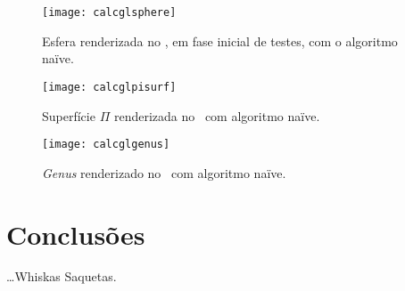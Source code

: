 \begin{figure}[!htbp]
	\centering
	\texttt{[image: calcglsphere]}
	\caption[Esfera no \theapp~com algoritmo naïve]{Esfera renderizada no \theapp, em fase inicial de testes, com o algoritmo naïve.}
	\label{fig::calcglsphere}
\end{figure}

\begin{figure}[!htbp]
	\centering
	\texttt{[image: calcglpisurf]}
	\caption[Superfície $\Pi$ no \theapp~com algoritmo naïve]{Superfície $\Pi$ renderizada no \theapp~com algoritmo naïve.}
	\label{fig::calcglpisurf}
\end{figure}

\begin{figure}[!htbp]
	\centering
	\texttt{[image: calcglgenus]}
	\caption[\textit{Genus} no \theapp~com algoritmo naïve]{\textit{Genus} renderizado no \theapp~com algoritmo naïve.}
	\label{fig::calcglgenus}
\end{figure}


\section{Conclusões}
\label{sec::testes:conc}

\ldots Whiskas Saquetas.
